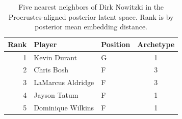 \begin{table}[htbp]
  \centering\small
  \begin{tabular}{rllc}
    \toprule
    Rank & Player & Position & Archetype \\
    \midrule
    1 & Kevin Durant & G & 1 \\
    2 & Chris Bosh & F & 3 \\
    3 & LaMarcus Aldridge & F & 3 \\
    4 & Jayson Tatum & F & 1 \\
    5 & Dominique Wilkins & F & 1 \\
    \bottomrule
  \end{tabular}
  \caption{Five nearest neighbors of Dirk Nowitzki in the Procrustes-aligned posterior latent space. Rank is by posterior mean embedding distance.}
  \label{tab:Dirk_Nowitzki_neighbors}
\end{table}

